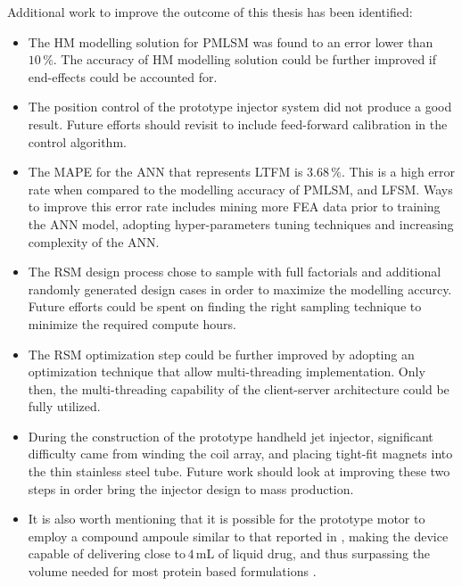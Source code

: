     Additional work to improve the outcome of this thesis has been identified:
    
    \begin{itemize}
        \item The \acs{HM} modelling solution for \acs{PMLSM} was found to an error lower than $10\,\%$. The accuracy of \acs{HM} modelling solution could be further improved if end-effects could be accounted for.
        \item The position control of the prototype injector system did not produce a good result. Future efforts should revisit to include feed-forward calibration in the control algorithm. 
        \item The \acf{MAPE} for the \acs{ANN} that represents \acs{LTFM} is $3.68\,\%$. This is a high error rate when compared to the modelling accuracy of \acs{PMLSM}, and \acs{LFSM}. Ways to improve this error rate includes mining more \acf{FEA} data prior to training the \acs{ANN} model, adopting hyper-parameters tuning techniques and increasing complexity of the \acs{ANN}.
        \item The \acs{RSM} design process chose to sample with full factorials and additional randomly generated design cases in order to maximize the modelling accurcy. Future efforts could be spent on finding the right sampling technique to minimize the required compute hours.
        \item The \acs{RSM} optimization step could be further improved by adopting an optimization technique that allow multi-threading implementation. Only then, the multi-threading capability of the client-server architecture could be fully utilized.   
        \item During the construction of the prototype handheld jet injector, significant difficulty came from winding the coil array, and placing tight-fit magnets into the thin stainless steel tube. Future work should look at improving these two steps in order bring the injector design to mass production.
        \item It is also worth mentioning that it is possible for the prototype motor to employ a compound ampoule similar to that reported in \cite{Ruddy2015a,McKeage2018}, making the device capable of delivering close to\,$4\,\mathrm{mL}$ of liquid drug, and thus surpassing the volume needed for most protein based formulations \cite{Hogan2015a}.
    \end{itemize}


